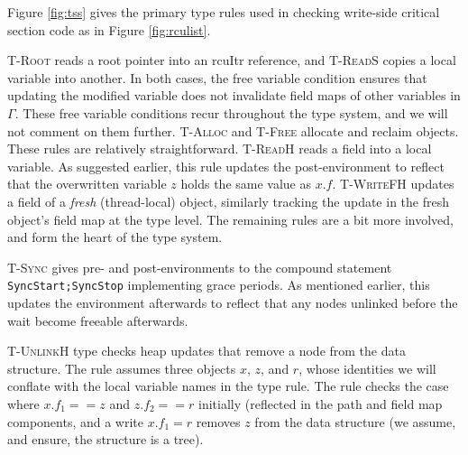 Figure \ref{fig:tss} gives the primary type rules used in checking write-side critical section code as in Figure \ref{fig:rculist}.

\textsc{T-Root} reads a root pointer into an \textsf{rcuItr} reference, and \textsc{T-ReadS} copies a local variable into another.  In both cases, the free variable condition ensures that updating the modified variable does not invalidate field maps of other variables in $\Gamma$. These free variable conditions recur throughout the type system, and we will not comment on them further.
\textsc{T-Alloc} and \textsc{T-Free} allocate and reclaim objects. These rules are relatively straightforward.
\textsc{T-ReadH} reads a field into a local variable.
As suggested earlier, this rule updates the post-environment to reflect that the overwritten variable $z$ holds the same value as $x.f$.
\textsc{T-WriteFH} updates a field of a \emph{fresh} (thread-local) object, similarly tracking the update in the fresh object's field map at the type level.
The remaining rules are a bit more involved, and form the heart of the type system.

\textsc{T-Sync} gives pre- and post-environments to the compound statement \lstinline|SyncStart;SyncStop| implementing grace periods.  As mentioned earlier, this updates the environment afterwards to reflect that any nodes \textsf{unlinked} before the wait become \textsf{freeable} afterwards.

\textsc{T-UnlinkH} type checks heap updates that remove a node from the data structure.  The rule assumes three objects $x$, $z$, and $r$, whose identities we will conflate with the local variable names in the type rule.  The rule checks the case where $x.f_1==z$ and $z.f_2==r$ initially (reflected in the path and field map components, and a write $x.f_1=r$ removes $z$ from the data structure (we assume, and ensure, the structure is a tree).

